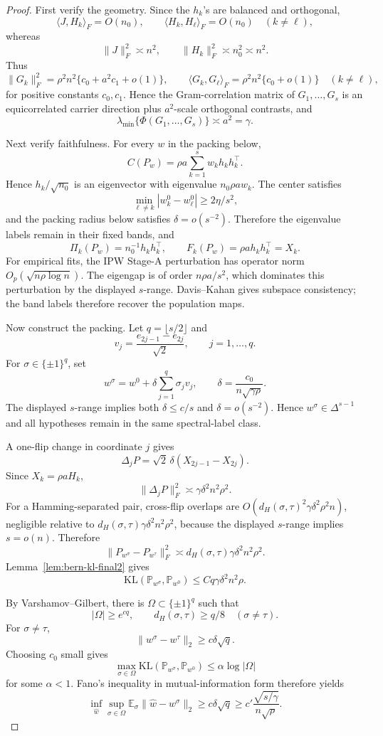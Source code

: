 \documentclass[12pt]{article}
\newcommand{\1}{\mathbf{1}}
\newcommand{\KL}{\mathrm{KL}}
\providecommand{\Pb}{\mathbb P}
\providecommand{\Eb}{\mathbb E}
\begin{document}
\begin{proof}
First verify the geometry.  Since the \(h_k\)'s are balanced and
orthogonal,
\[
  \langle J,H_k\rangle_F=O(n_0),\qquad
  \langle H_k,H_\ell\rangle_F=O(n_0)\quad(k\ne\ell),
\]
whereas
\[
  \|J\|_F^2\asymp n^2,\qquad \|H_k\|_F^2\asymp n_0^2\asymp n^2.
\]
Thus
\[
  \|G_k\|_F^2=\rho^2n^2\{c_0+a^2c_1+o(1)\},
  \qquad
  \langle G_k,G_\ell\rangle_F=\rho^2n^2\{c_0+o(1)\}
  \quad(k\ne\ell),
\]
for positive constants \(c_0,c_1\).  Hence the Gram-correlation matrix
of \(G_1,\ldots,G_s\) is an equicorrelated carrier direction plus
\(a^2\)-scale orthogonal contrasts, and
\[
  \lambda_{\min}\{\Phi(G_1,\ldots,G_s)\}\asymp a^2=\gamma .
\]

Next verify faithfulness.  For every \(w\) in the packing below,
\[
  C(P_w)=\rho a\sum_{k=1}^s w_kh_kh_k^\top .
\]
Hence \(h_k/\sqrt{n_0}\) is an eigenvector with eigenvalue
\(n_0\rho a w_k\).  The center satisfies
\[
  \min_{\ell\ne k}|w_k^0-w_\ell^0|\ge 2\eta/s^2,
\]
and the packing radius below satisfies \(\delta=o(s^{-2})\).  Therefore
the eigenvalue labels remain in their fixed bands, and
\[
  \Pi_k(P_w)=n_0^{-1}h_kh_k^\top,\qquad
  F_k(P_w)=\rho a h_kh_k^\top=X_k .
\]
For empirical fits, the IPW Stage-A perturbation has operator norm
\(O_p(\sqrt{n\rho\log n})\).  The eigengap is of order
\(n\rho a/s^2\), which dominates this perturbation by the displayed
\(s\)-range.  Davis--Kahan gives subspace consistency; the band labels
therefore recover the population maps.

Now construct the packing.  Let \(q=\lfloor s/2\rfloor\) and
\[
  v_j=\frac{e_{2j-1}-e_{2j}}{\sqrt2},\qquad j=1,\ldots,q.
\]
For \(\sigma\in\{\pm1\}^q\), set
\[
  w^\sigma=w^0+\delta\sum_{j=1}^q\sigma_jv_j,
  \qquad
  \delta=\frac{c_0}{n\sqrt{\gamma\rho}} .
\]
The displayed \(s\)-range implies both \(\delta\le c/s\) and
\(\delta=o(s^{-2})\).  Hence \(w^\sigma\in\Delta^{s-1}\) and all
hypotheses remain in the same spectral-label class.

A one-flip change in coordinate \(j\) gives
\[
  \Delta_jP
  =
  \sqrt2\,\delta(X_{2j-1}-X_{2j}).
\]
Since \(X_k=\rho aH_k\),
\[
  \|\Delta_jP\|_F^2
  \asymp
  \gamma\delta^2n^2\rho^2 .
\]
For a Hamming-separated pair, cross-flip overlaps are
\(O(d_H(\sigma,\tau)^2\gamma\delta^2\rho^2n)\), negligible relative to
\(d_H(\sigma,\tau)\gamma\delta^2n^2\rho^2\), because the displayed
\(s\)-range implies \(s=o(n)\).  Therefore
\[
  \|P_{w^\sigma}-P_{w^\tau}\|_F^2
  \asymp
  d_H(\sigma,\tau)\gamma\delta^2n^2\rho^2.
\]
Lemma~\ref{lem:bern-kl-final2} gives
\[
  \KL(\Pb_{w^\sigma},\Pb_{w^0})
  \le
  Cq\gamma\delta^2n^2\rho .
\]

By Varshamov--Gilbert, there is
\(\Omega\subset\{\pm1\}^q\) such that
\[
  |\Omega|\ge e^{cq},
  \qquad
  d_H(\sigma,\tau)\ge q/8\quad(\sigma\ne\tau).
\]
For \(\sigma\ne\tau\),
\[
  \|w^\sigma-w^\tau\|_2\ge c\delta\sqrt q .
\]
Choosing \(c_0\) small gives
\[
  \max_{\sigma\in\Omega}\KL(\Pb_{w^\sigma},\Pb_{w^0})
  \le
  \alpha\log|\Omega|
\]
for some \(\alpha<1\).  Fano's inequality in mutual-information form
therefore yields
\[
  \inf_{\widehat w}\sup_{\sigma\in\Omega}
  \Eb_\sigma\|\widehat w-w^\sigma\|_2
  \ge
  c\delta\sqrt q
  \ge
  c'\frac{\sqrt{s/\gamma}}{n\sqrt\rho}.
\]
\end{proof}
\end{document}

